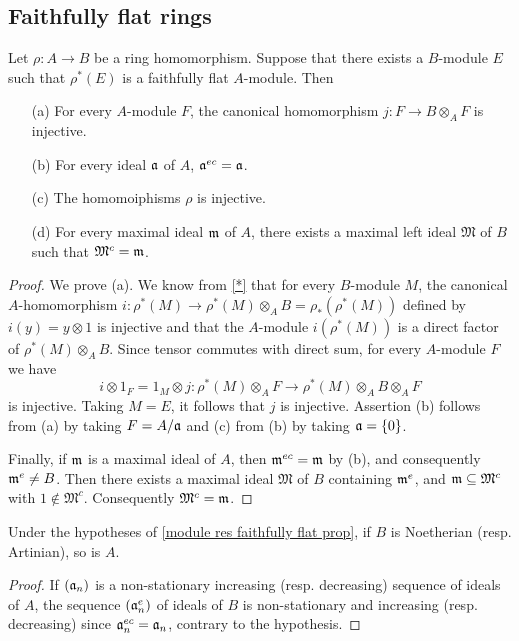 \subsection{Faithfully flat rings}
\begin{proposition}\label{module res faithfully flat prop}
Let $\rho:A\to B$ be a ring homomorphism. Suppose that there exists a $B$-module $E$ such that $\rho^*(E)$ is a faithfully flat $A$-module. Then
\begin{itemize}
\item[(a)] For every $A$-module $F$, the canonical homomorphism $j:F\to B\otimes_AF$ is injective.
\item[(b)] For every ideal $\mathfrak{a}$ of $A$, $\mathfrak{a}^{ec}=\mathfrak{a}$.
\item[(c)] The homomoiphisms $\rho$ is injective.
\item[(d)] For every maximal ideal $\mathfrak{m}$ of $A$, there exists a maximal left ideal $\mathfrak{M}$ of $B$ such that $\mathfrak{M}^c=\mathfrak{m}$.
\end{itemize}
\end{proposition}
\begin{proof}
We prove (a). We know from \cref{*} that for every $B$-module $M$, the canonical $A$-homomorphism $i:\rho^*(M)\to \rho^*(M)\otimes_AB=\rho_*(\rho^*(M))$ defined by $i(y)=y\otimes 1$ is injective and that the $A$-module $i(\rho^*(M))$ is a direct factor of $\rho^*(M)\otimes_AB$. Since tensor commutes with direct sum, for every $A$-module $F$ we have
\[i\otimes 1_F=1_M\otimes j:\rho^*(M)\otimes_AF\to\rho^*(M)\otimes_AB\otimes_AF\]
is injective. Taking $M=E$, it follows that $j$ is injective. Assertion (b) follows from (a) by taking $F=A/\mathfrak{a}$ and (c) from (b) by taking $\mathfrak{a}=\{0\}$.\par
Finally, if $\mathfrak{m}$ is a maximal ideal of $A$, then $\mathfrak{m}^{ec}=\mathfrak{m}$ by (b), and consequently $\mathfrak{m}^e\neq B$. Then there exists a maximal ideal $\mathfrak{M}$ of $B$ containing $\mathfrak{m}^e$, and $\mathfrak{m}\subseteq\mathfrak{M}^c$ with $1\notin\mathfrak{M}^c$. Consequently $\mathfrak{M}^c=\mathfrak{m}$.
\end{proof}
\begin{corollary}
Under the hypotheses of \cref{module res faithfully flat prop}, if $B$ is Noetherian (resp. Artinian), so is $A$.
\end{corollary}
\begin{proof}
If $(\mathfrak{a}_n)$ is a non-stationary increasing (resp. decreasing) sequence of ideals of $A$, the sequence $(\mathfrak{a}_n^e)$ of ideals of $B$ is non-stationary and increasing (resp. decreasing) since $\mathfrak{a}_n^{ec}=\mathfrak{a}_n$, contrary to the hypothesis.
\end{proof}
